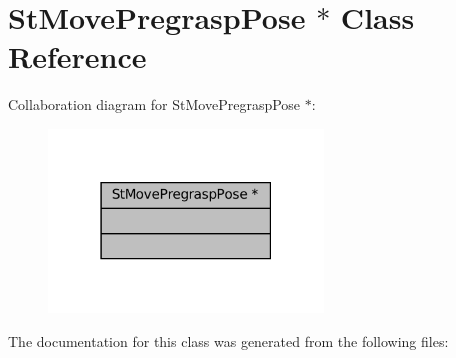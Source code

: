 \hypertarget{classStMovePregraspPose_01_5}{}\section{St\+Move\+Pregrasp\+Pose $\ast$ Class Reference}
\label{classStMovePregraspPose_01_5}


Collaboration diagram for St\+Move\+Pregrasp\+Pose $\ast$\+:
\nopagebreak
\begin{figure}[H]
\begin{center}
\leavevmode
\includegraphics[width=207pt]{classStMovePregraspPose_01_5__coll__graph}
\end{center}
\end{figure}


The documentation for this class was generated from the following files\+: